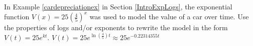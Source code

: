 {In Example \ref{cardepreciationex} in Section \ref{IntroExpLogs}, the exponential function $V(x) = 25 \left(\frac{4}{5}\right)^{x}$ was used to model the value of a car over time.  Use the properties of logs and/or exponents to rewrite the model in the form $V(t) = 25e^{kt}$.}
{$V(t) = 25e^{\ln\left(\frac{4}{5}\right)t} \approx 25e^{-0.22314355t}$}